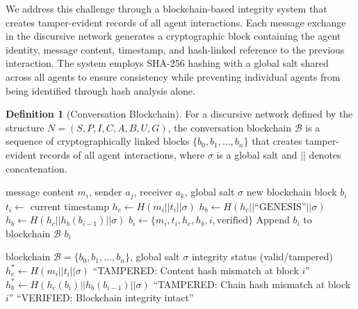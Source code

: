 \documentclass[12pt]{article}
\theoremstyle{definition}
\newtheorem{definition}{Definition}[section]
\begin{document}

We address this challenge through a blockchain-based integrity system that creates tamper-evident records of all agent interactions. Each message exchange in the discursive network generates a cryptographic block containing the agent identity, message content, timestamp, and hash-linked reference to the previous interaction. The system employs SHA-256 hashing with a global salt shared across all agents to ensure consistency while preventing individual agents from being identified through hash analysis alone.

\begin{definition}[Conversation Blockchain]
For a discursive network defined by the structure $N = (S,P,I,C,A,B,U,G)$, the conversation blockchain $\mathcal{B}$ is a sequence of cryptographically linked blocks $\{b_0, b_1, \ldots, b_n\}$ that creates tamper-evident records of all agent interactions, where $\sigma$ is a global salt and $||$ denotes concatenation.
\end{definition}

\begin{algorithm}[htb]
\caption{Blockchain record creation for discursive networks}
\label{algo:blockchain}
\begin{algorithmic}[1]
\Require message content $m_i$, sender $a_j$, receiver $a_k$, global salt $\sigma$
\Ensure new blockchain block $b_i$
\State $t_i \gets$ current timestamp
\State $h_c \gets H(m_i || t_i || \sigma)$ 
 
    \State $h_b \gets H(h_c || \text{``GENESIS''} || \sigma)$
\Else
    \State $h_b \gets H(h_c || h_b(b_{i-1}) || \sigma)$ 
\EndIf
\State $b_i \gets \{m_i, t_i, h_c, h_b, i, \text{verified}\}$
\State Append $b_i$ to blockchain $\mathcal{B}$
\State \Return $b_i$
\end{algorithmic}
\end{algorithm}

\begin{algorithm}[htb]
\caption{Blockchain integrity verification}
\label{algo:blockchain-verify}
\begin{algorithmic}[1]
\Require blockchain $\mathcal{B} = \{b_0, b_1, \ldots, b_n\}$, global salt $\sigma$
\Ensure integrity status (valid/tampered)
    \State $h_c^* \gets H(m_i || t_i || \sigma)$
        \State \Return ``TAMPERED: Content hash mismatch at block $i$''
    \EndIf
        \State $h_b^* \gets H(h_c(b_i) || h_b(b_{i-1}) || \sigma)$
            \State \Return ``TAMPERED: Chain hash mismatch at block $i$''
        \EndIf
    \EndIf
\EndFor
\State \Return ``VERIFIED: Blockchain integrity intact''
\end{algorithmic}
\end{algorithm}
\end{document}
